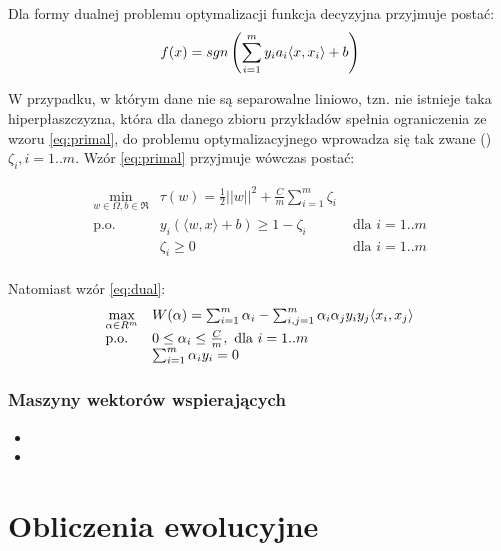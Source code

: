 Dla formy dualnej problemu optymalizacji funkcja decyzyjna przyjmuje postać:
\begin{equation}
f(x) = sgn \left( \sum_{i=1}^{m} y_i a_i \langle x, x_i \rangle + b \right)
\end{equation}

W przypadku, w którym dane nie są separowalne liniowo, tzn. nie istnieje taka hiperpłaszczyzna, która dla danego zbioru przykładów spełnia ograniczenia ze wzoru \ref{eq:primal}, do problemu optymalizacyjnego wprowadza się tak zwane  () $ \zeta_i, i=1..m $.
Wzór \ref{eq:primal} przyjmuje wówczas postać: 

\begin{equation}
\begin{array}{lll}
\min\limits_{w \in \Omega, b \in \Re} &  \tau(w) = \frac{1}{2}||w||^2 + \frac{C}{m} \sum_{i=1}^{m} \zeta_i & \\
\text{p.o.} &  y_i  (\langle w, x \rangle + b) \geq 1 - \zeta_i & \text{ dla } i=1..m \\
& \zeta_i \geq 0 & \text{ dla } i=1..m \\
\end{array}
\label{eq:primal-c}
\end{equation}

Natomiast wzór \ref{eq:dual}:
\begin{equation}
\begin{array}{ll}
\max\limits_{\alpha \in R^m} & W(\alpha) = \sum_{i=1}^{m} \alpha_i - \sum_{i,j=1}^{m} \alpha_i \alpha_j y_i y_j \langle x_i, x_j \rangle \\
\text{p.o.} & 0 \leq \alpha_i \leq \frac{C}{m} , \text{ dla } i=1..m \\
& \sum_{i=1}^{m} \alpha_i y_i = 0
\end{array}
\label{eq:dual-c}
\end{equation}


\subsubsection{Maszyny wektorów wspierających}

\begin{itemize}
\item {}
\item {}
\end{itemize}

\section{Obliczenia ewolucyjne}

